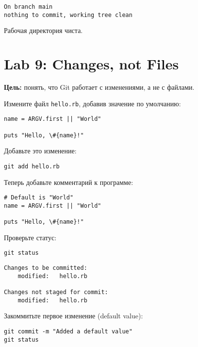 \documentclass[a4paper,12pt]{report}
\begin{document}
\begin{verbatim}
On branch main
nothing to commit, working tree clean
\end{verbatim}

Рабочая директория чиста.



\section{Lab 9: Changes, not Files}
\textbf{Цель:} понять, что Git работает с изменениями, а не с файлами.

Измените файл \texttt{hello.rb}, добавив значение по умолчанию:
\begin{verbatim}
name = ARGV.first || "World"

puts "Hello, \#{name}!"
\end{verbatim}

Добавьте это изменение:
\begin{verbatim}
git add hello.rb
\end{verbatim}

Теперь добавьте комментарий к программе:
\begin{verbatim}
# Default is "World"
name = ARGV.first || "World"

puts "Hello, \#{name}!"
\end{verbatim}

Проверьте статус:
\begin{verbatim}
git status
\end{verbatim}

\begin{verbatim}
Changes to be committed:
	modified:   hello.rb

Changes not staged for commit:
	modified:   hello.rb
\end{verbatim}


Закоммитьте первое изменение (default value):
\begin{verbatim}
git commit -m "Added a default value"
git status
\end{verbatim}
\end{document}
